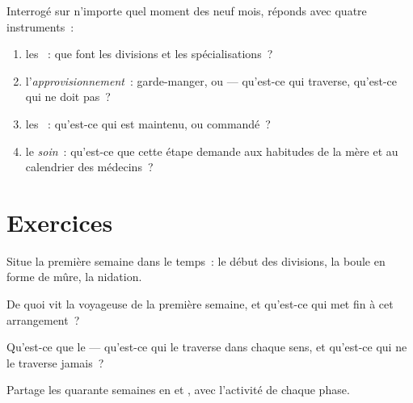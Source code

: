 \begin{method}\label{met:g8:from-egg-to-birth:explain}
Interrogé sur n'importe quel moment des neuf mois, réponds avec
quatre instruments~:
\begin{enumerate}
  \item les \emph{}~: que font les divisions et les
        spécialisations~?
  \item l'\emph{approvisionnement}~: garde-manger, ou  ---
        qu'est-ce qui traverse, qu'est-ce qui ne doit pas~?
  \item les \emph{}~: qu'est-ce qui est maintenu, ou
        commandé~?
  \item le \emph{soin}~: qu'est-ce que cette étape demande aux
        habitudes de la mère et au calendrier des médecins~?
\end{enumerate}
\end{method}

\section{Exercices}

\begin{exercise}[$\star$]\label{exo:g8:from-egg-to-birth:1}
Situe la première semaine dans le temps~: le début des divisions, la
boule en forme de mûre, la nidation.
\end{exercise}

\begin{exercise}[$\star$]\label{exo:g8:from-egg-to-birth:2}
De quoi vit la voyageuse de la première semaine, et qu'est-ce qui
met fin à cet arrangement~?
\end{exercise}

\begin{exercise}[$\star$]\label{exo:g8:from-egg-to-birth:3}
Qu'est-ce que le  --- qu'est-ce qui le traverse dans chaque
sens, et qu'est-ce qui ne le traverse jamais~?
\end{exercise}

\begin{exercise}[$\star$]\label{exo:g8:from-egg-to-birth:4}
Partage les quarante semaines en  et , avec l'activité
de chaque phase.
\end{exercise}


